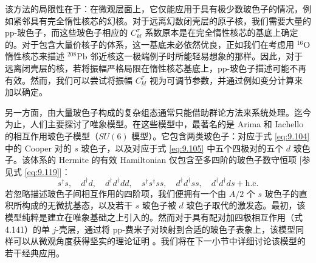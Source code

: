 该方法的局限性在于：在微观层面上，它仅能应用于具有极少数玻色子的情况，例如紧邻具有完全惰性核芯的幻核。对于远离幻数闭壳层的原子核，我们需要大量的
pp-玻色子，而这些玻色子相应的 $C^{\tau}_{kl}$ 系数原本是在完全惰性核芯的基底上确定的。对于包含大量价核子的体系，这一基底未必依然优良，正如我们在考虑用
$^{16}\text{O}$ 惰性核芯来描述 $^{208}\text{Pb}$ 邻近核这一极端例子时所能轻易想象的那样。因此，对于远离闭壳层的核，若将振幅严格局限在惰性核芯基底上，pp-玻色子描述可能不再有效。然而，我们可以尝试将振幅
$C^{\tau}_{kl}$ 视为可调节参数，并通过例如变分计算来加以确定。

另一方面，由大量玻色子构成的复杂组态通常只能借助群论方法来系统处理。迄今为止，人们主要探讨了唯象模型。在这些模型中，最著名的是 Arima
和 Iachello 的相互作用玻色子模型（$SU(6)$ 模型）\cite{AI75a,AI75b}。它包含两类玻色子：对应于式
\ref{eq:9.104} 中的 Cooper 对的 $s$ 玻色子，以及对应于式 \ref{eq:9.105} 中五个四极对的五个
$d$ 玻色子。该体系的 Hermite 的有效 Hamiltonian 仅包含至多四阶的玻色子数守恒项 {[}参见式 \ref{eq:9.119}{]}：
\[
s^{\dagger}s,\quad d^{\dagger}d,\quad d^{\dagger}d^{\dagger}dd,\quad s^{\dagger}s^{\dagger}ss,\quad d^{\dagger}d^{\dagger}ss,\quad d^{\dagger}d^{\dagger}ds+\text{h.c.}
\]
若忽略描述玻色子间相互作用的四阶项，我们便拥有一个由 $A/2$ 个 $s$ 玻色子的直积所构成的无微扰基态，以及若干 $s$
玻色子被 $d$ 玻色子取代的激发态。最初，该模型纯粹是建立在唯象基础之上引入的。然而对于具有配对加四极相互作用（式 4.141）的单
$j$-壳层，通过将 pp-费米子对映射到合适的玻色子表象上，该模型同样可以从微观角度获得坚实的理论证明 \cite{AOI77}。我们将在下一小节中详细讨论该模型的若干经典应用。

